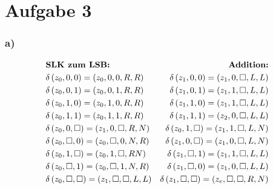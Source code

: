 \documentclass[a4paper,12pt]{article}
\begin{document}
	\section*{Aufgabe 3}
	\subsubsection*{a)}
	
	\begin{align*}
		&\text{\textbf{SLK zum LSB:}} &\text{\textbf{Addition:}}\\
		&\delta \left( z_0,0,0\right) = \left( z_0, 0, 0, R, R\right)& \delta \left( z_1,0,0\right) = \left( z_1, 0, \square, L, L\right)\\
		&\delta \left( z_0,0,1\right) = \left( z_0, 0, 1, R, R\right)& \delta \left( z_1,0,1\right) = \left( z_1, 1,  \square, L, L\right)\\
		&\delta \left( z_0,1,0\right) = \left( z_0, 1, 0, R, R\right)& \delta \left( z_1,1,0\right) = \left( z_1, 1, \square, L, L\right)\\
		&\delta \left( z_0,1,1\right) = \left( z_0, 1, 1, R, R\right)& \delta \left( z_1,1,1\right) = \left( z_2, 0, \square, L, L\right)\\
		&\delta \left( z_0,0,\square\right) = \left( z_1, 0, \square, R, N\right)& \delta \left( z_0,1,\square\right) = \left( z_1, 1, \square, L, N\right)\\
		&\delta \left( z_0,\square, 0\right) = \left( z_0, \square,0, N, R\right)& \delta \left( z_1,0,\square\right) = \left( z_1, 0, \square, L, N\right)\\
		&\delta \left( z_0, 1,\square\right) = \left( z_0, 1, \square, R N\right)& \delta \left( z_1,\square, 1\right) = \left( z_1, 1, \square, L, L\right)\\
		&\delta \left( z_0,\square, 1\right) = \left( z_0, \square,1, N, R\right)& \delta \left( z_1,\square, 0\right) = \left( z_1, 0, \square, L, L\right)\\
		&\delta \left( z_0,\square, \square\right) = \left( z_1, \square,\square, L, L\right)& \delta \left( z_1,\square,\square\right) = \left( z_e, \square, \square, R, N\right)\\
	\end{align*}
\end{document}
